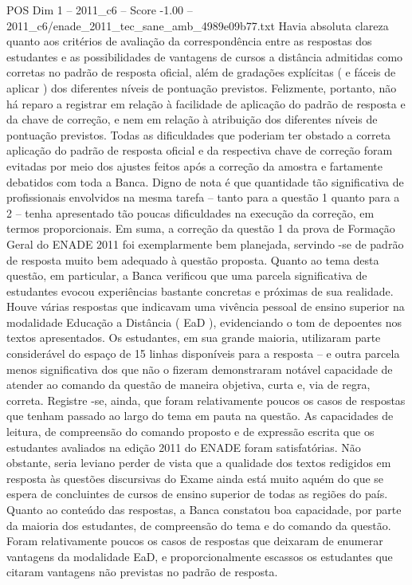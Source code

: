\begin{textsample}{POS Dim 1 – 2011\_c6 – Score -1.00 – 2011\_c6/enade\_2011\_tec\_sane\_amb\_4989e09b77.txt}
Havia absoluta clareza quanto aos critérios de avaliação da correspondência entre as respostas dos estudantes e as possibilidades de vantagens de cursos a distância admitidas como corretas no padrão de resposta oficial, além de gradações explícitas ( e fáceis de aplicar ) dos diferentes níveis de pontuação previstos.
Felizmente, portanto, não há reparo a registrar em relação à facilidade de aplicação do padrão de resposta e da chave de correção, e nem em relação à atribuição dos diferentes níveis de pontuação previstos.
Todas as dificuldades que poderiam ter obstado a correta aplicação do padrão de resposta oficial e da respectiva chave de correção foram evitadas por meio dos ajustes feitos após a correção da amostra e fartamente debatidos com toda a Banca.
Digno de nota é que quantidade tão significativa de profissionais envolvidos na mesma tarefa – tanto para a questão 1 quanto para a 2 – tenha apresentado tão poucas dificuldades na execução da correção, em termos proporcionais.
Em suma, a correção da questão 1 da prova de Formação Geral do ENADE 2011 foi exemplarmente bem planejada, servindo -se de padrão de resposta muito bem adequado à questão proposta.
Quanto ao tema desta questão, em particular, a Banca verificou que uma parcela significativa de estudantes evocou experiências bastante concretas e próximas de sua realidade.
Houve várias respostas que indicavam uma vivência pessoal de ensino superior na modalidade Educação a Distância ( EaD ), evidenciando o tom de depoentes nos textos apresentados.
Os estudantes, em sua grande maioria, utilizaram parte considerável do espaço de 15 linhas disponíveis para a resposta – e outra parcela menos significativa dos que não o fizeram demonstraram notável capacidade de atender ao comando da questão de maneira objetiva, curta e, via de regra, correta.
Registre -se, ainda, que foram relativamente poucos os casos de respostas que tenham passado ao largo do tema em pauta na questão.
As capacidades de leitura, de compreensão do comando proposto e de expressão escrita que os estudantes avaliados na edição 2011 do ENADE foram satisfatórias.
Não obstante, seria leviano perder de vista que a qualidade dos textos redigidos em resposta às questões discursivas do Exame ainda está muito aquém do que se espera de concluintes de cursos de ensino superior de todas as regiões do país.
Quanto ao conteúdo das respostas, a Banca constatou boa capacidade, por parte da maioria dos estudantes, de compreensão do tema e do comando da questão.
Foram relativamente poucos os casos de respostas que deixaram de enumerar vantagens da modalidade EaD, e proporcionalmente escassos os estudantes que citaram vantagens não previstas no padrão de resposta.

\end{textsample}
